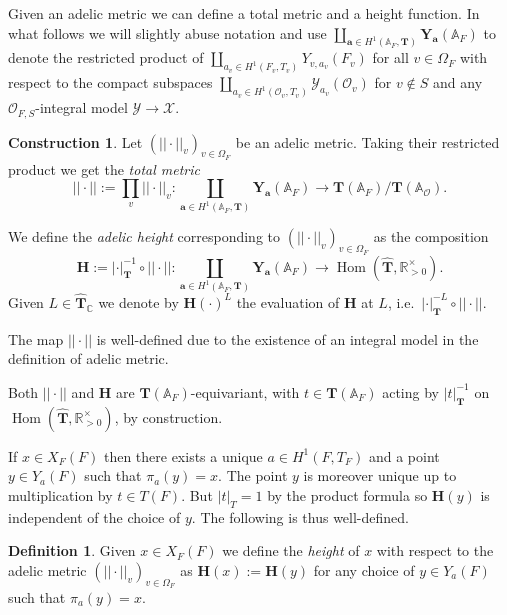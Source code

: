 \documentclass[a4paper,11pt,reqno]{amsart}
\newcommand{\R}{\mathbb{R}}
\newcommand{\C}{\mathbb{C}}
\newcommand{\A}{\mathbb{A}}
\DeclareMathOperator{\Hom}{Hom}
\theoremstyle{definition}
\newtheorem{definition}[theorem]{Definition}
\newtheorem{construction}[theorem]{Construction}
\begin{document}
Given an adelic metric we can define a total metric and a height function. In what follows we will slightly abuse notation and use $\coprod_{\mathbf{a} \in H^1(\A_F, \mathbf{T})} \mathbf{Y}_{\mathbf{a}}(\A_F)$ to denote the restricted product of $\coprod_{a_v \in H^1(F_v, T_v)} Y_{v, a_v}(F_v)$ for all $v \in \Omega_{F}$ with respect to the compact subspaces $\coprod_{a_v \in H^1(\mathcal{O}_v, T_v)} \mathcal{Y}_{a_v}(\mathcal{O}_v)$ for $v \not \in S$ and any $\mathcal{O}_{F, S}$-integral model $\mathcal{Y} \to \mathcal{X}$.
\begin{construction}
	Let $(||\cdot||_v)_{v \in\Omega_F}$ be an adelic metric. Taking their restricted product we get the \emph{total metric}
	\begin{equation*}
		|| \cdot|| := \prod_v ||\cdot||_v: \coprod_{\mathbf{a} \in H^1(\A_F, \mathbf{T})} \mathbf{Y}_{\mathbf{a}}(\A_F) \to \mathbf{T}(\A_F)/\mathbf{T}(\A_{\mathcal{O}}).
	\end{equation*}

	We define the \emph{adelic height} corresponding to $(||\cdot||_v)_{v \in\Omega_F}$ as the composition 
	\begin{equation*}
		\mathbf{H} := |\cdot|_{\mathbf{T}}^{-1} \circ ||\cdot|| :\coprod_{\mathbf{a} \in H^1(\A_F, \mathbf{T})} \mathbf{Y}_{\mathbf{a}}(\A_F) \to \Hom(\hat{\mathbf{T}}, \R_{>0}^{\times}).
	\end{equation*}
	Given $L \in \hat{\mathbf{T}}_{\C}$ we denote by $\mathbf{H}(\cdot)^{L}$ the evaluation of $\mathbf{H}$ at $L$, i.e.~$|\cdot|_{\mathbf{T}}^{-L} \circ ||\cdot||$.
	
	The map $||\cdot||$ is well-defined due to the existence of an integral model in the definition of adelic metric.
	
	Both $||\cdot||$ and $\mathbf{H}$ are $\mathbf{T}(\A_F)$-equivariant, with $t \in \mathbf{T}(\A_F)$ acting by $|t|_{\mathbf{T}}^{-1}$ on $\Hom(\hat{\mathbf{T}}, \R_{>0}^{\times})$, by construction.
\end{construction}

If $x \in X_F(F)$ then there exists a unique $a \in H^1(F, T_F)$ and a point $y \in Y_a(F)$ such that $\pi_{a}(y) = x$. The point $y$ is moreover unique up to multiplication by $t \in T(F)$. But $|t|_T = 1$ by the product formula so $\mathbf{H}(y)$ is independent of the choice of $y$. The following is thus well-defined.
\begin{definition}
	Given $x \in X_F(F)$ we define the \emph{height} of $x$ with respect to the adelic metric $(||\cdot||_v)_{v \in\Omega_F}$ as $\mathbf{H}(x) := \mathbf{H}(y)$ for any choice of $y \in Y_a(F)$ such that $\pi_{a}(y) = x$.
\end{definition}
\end{document}
